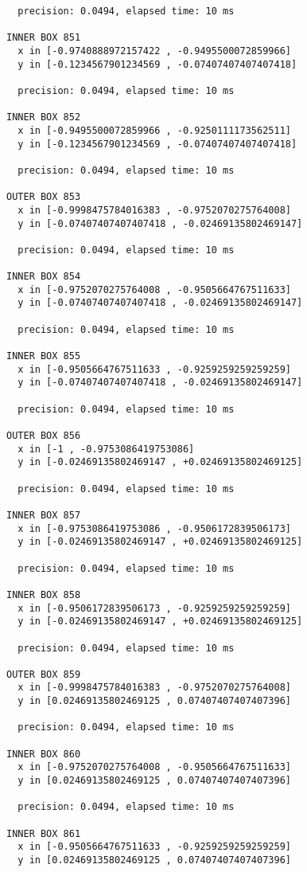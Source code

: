 \begin{verbatim}
  precision: 0.0494, elapsed time: 10 ms

INNER BOX 851
  x in [-0.9740888972157422 , -0.9495500072859966]
  y in [-0.1234567901234569 , -0.07407407407407418]

  precision: 0.0494, elapsed time: 10 ms

INNER BOX 852
  x in [-0.9495500072859966 , -0.9250111173562511]
  y in [-0.1234567901234569 , -0.07407407407407418]

  precision: 0.0494, elapsed time: 10 ms

OUTER BOX 853
  x in [-0.9998475784016383 , -0.9752070275764008]
  y in [-0.07407407407407418 , -0.02469135802469147]

  precision: 0.0494, elapsed time: 10 ms

INNER BOX 854
  x in [-0.9752070275764008 , -0.9505664767511633]
  y in [-0.07407407407407418 , -0.02469135802469147]

  precision: 0.0494, elapsed time: 10 ms

INNER BOX 855
  x in [-0.9505664767511633 , -0.9259259259259259]
  y in [-0.07407407407407418 , -0.02469135802469147]

  precision: 0.0494, elapsed time: 10 ms

OUTER BOX 856
  x in [-1 , -0.9753086419753086]
  y in [-0.02469135802469147 , +0.02469135802469125]

  precision: 0.0494, elapsed time: 10 ms

INNER BOX 857
  x in [-0.9753086419753086 , -0.9506172839506173]
  y in [-0.02469135802469147 , +0.02469135802469125]

  precision: 0.0494, elapsed time: 10 ms

INNER BOX 858
  x in [-0.9506172839506173 , -0.9259259259259259]
  y in [-0.02469135802469147 , +0.02469135802469125]

  precision: 0.0494, elapsed time: 10 ms

OUTER BOX 859
  x in [-0.9998475784016383 , -0.9752070275764008]
  y in [0.02469135802469125 , 0.07407407407407396]

  precision: 0.0494, elapsed time: 10 ms

INNER BOX 860
  x in [-0.9752070275764008 , -0.9505664767511633]
  y in [0.02469135802469125 , 0.07407407407407396]

  precision: 0.0494, elapsed time: 10 ms

INNER BOX 861
  x in [-0.9505664767511633 , -0.9259259259259259]
  y in [0.02469135802469125 , 0.07407407407407396]


\end{verbatim}
